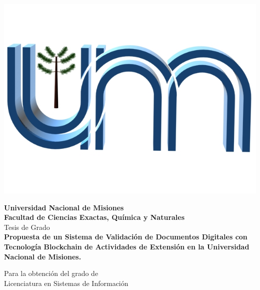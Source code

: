 \clearpage
\thispagestyle{empty} 
\pagestyle{empty} %


\begin{center}
\centering
\includegraphics[scale=0.2] {imagenes/logo-unam.png}


\vspace{0.2cm}
{\Large\bf Universidad Nacional de Misiones \\}
\vspace{0.2cm}
{\Large\bf Facultad de Ciencias Exactas, Química y Naturales \\}
\vspace{0.2cm}
{\huge Tesis de Grado\\}
\vspace{1cm}
{\Large\bf {Propuesta de un Sistema de Validación de Documentos Digitales con Tecnología  Blockchain  de Actividades de Extensión en la Universidad Nacional de Misiones.} \\}


\vspace{0.8cm}
{\normalsize 
Para la obtenci\'on del grado de\\
{\Large Licenciatura en Sistemas de Información}
}


\end{center}
